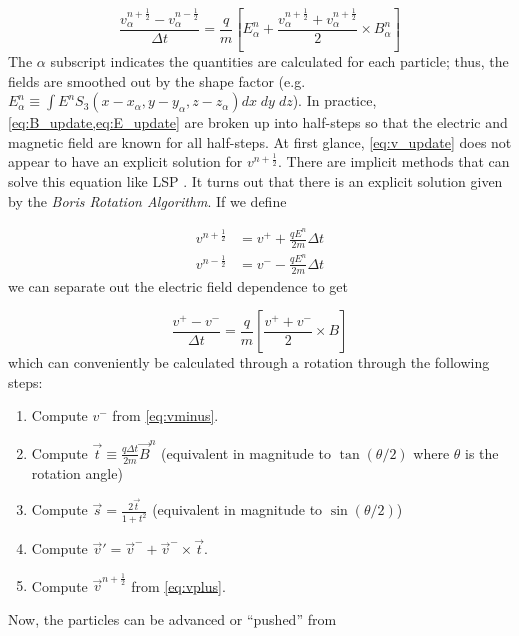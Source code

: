\begin{equation}
	\frac{v^{n + \frac{1}{2}}_\alpha - v^{n - \frac{1}{2}}_\alpha}{\Delta t} = \frac{q}{m}[E^n_\alpha + \frac{v^{n + \frac{1}{2}}_\alpha + v^{n + \frac{1}{2}}_\alpha}{2} \times B^n_\alpha] \label{eq:v_update}
\end{equation}
The $\alpha$ subscript indicates the quantities are calculated for each particle; thus, the fields are smoothed out by the shape factor (e.g. $E^n_\alpha \equiv \int E^n S_3(x-x_\alpha, y-y_\alpha, z-z_\alpha) dx \; dy \; dz$). In practice, \cref{eq:B_update,eq:E_update} are broken up into half-steps so that the electric and magnetic field are known for all half-steps. At first glance, \cref{eq:v_update} does not appear to have an explicit solution for $v^{n + \frac{1}{2}}$. There are implicit methods that can solve this equation like \gls{LSP} \cite{Welch_2004_LSP}. It turns out that there is an explicit solution given by the \emph{Boris Rotation Algorithm}. If we define 

\begin{align}
	v^{n + \frac{1}{2}} &= v^+ + \frac{q E^n}{2 m} \Delta t \label{eq:vplus} \\
	v^{n - \frac{1}{2}} &= v^- - \frac{q E^n}{2 m} \Delta t \label{eq:vminus}
\end{align}
we can separate out the electric field dependence to get 

\begin{equation}
	\frac{v^+ - v^-}{\Delta t} = \frac{q}{m}[\frac{v^+ + v^-}{2} \times B]
\end{equation}
which can conveniently be calculated through a rotation \cite{Birdsall_2004_PIC} through the following steps:

\begin{enumerate}
	\item Compute $v^-$ from \cref{eq:vminus}.
	\item Compute $\vec{t} \equiv \frac{q \Delta t}{2 m} \vec{B}^n $ (equivalent in magnitude to $\tan(\theta/2)$ where $\theta$ is the rotation angle)
	\item Compute $\vec{s} = \frac{2 \vec{t}}{1 + t^2}$ (equivalent in magnitude to $\sin(\theta/2)$)
	\item Compute $\vec{v}' = \vec{v}^- + \vec{v}^- \times \vec{t}$.
	\item Compute $\vec{v}^{n+\frac{1}{2}}$ from \cref{eq:vplus}.
\end{enumerate}
Now, the particles can be advanced or ``pushed'' from

